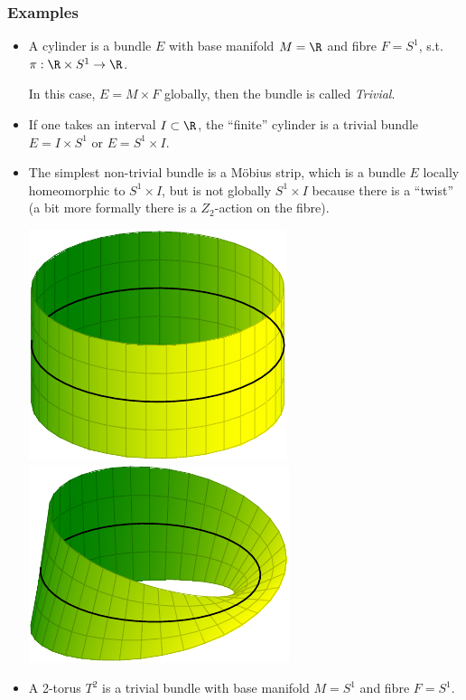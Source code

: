 \subsubsection*{Examples}
\begin{itemize}
\item A cylinder is a bundle $E$ with base manifold $M = \R$ and fibre $F = S^1$, s.t. $\pi: \R \times S^1 \to \R$.
  
  In this case, $E = M \times F$ globally, then the bundle is called \emph{Trivial}.
\item If one takes an interval $I \subset \R$, the ``finite'' cylinder is a trivial bundle $E = I \times S^1$ or $E = S^1 \times I$.
\item The simplest non-trivial bundle is a M\"obius strip, which is a bundle $E$ locally homeomorphic to $S^1 \times I$, but is not globally $S^1 \times I$ because there is a ``twist'' (a bit more formally there is a $Z_2$-action on the fibre).
  \begin{center}
    \includegraphics{Pictures/tikz-cylinder.pdf}
    \hspace{5em}
    \includegraphics{Pictures/tikz-moebius.pdf}
  \end{center}
\item  A 2-torus $T^2$ is a trivial bundle with base manifold $M = S^1$ and fibre $F = S^1$.
\end{itemize}

